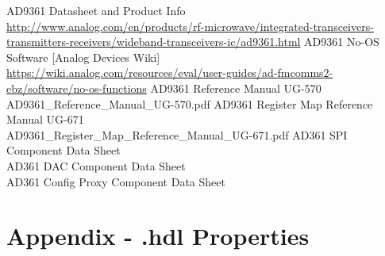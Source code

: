\begin{thebibliography}{1}

 AD9361 Datasheet and Product Info \\
\url{http://www.analog.com/en/products/rf-microwave/integrated-transceivers-transmitters-receivers/wideband-transceivers-ic/ad9361.html}
 AD9361 No-OS Software [Analog Devices Wiki]\\
\url{https://wiki.analog.com/resources/eval/user-guides/ad-fmcomms2-ebz/software/no-os-functions}
 AD9361 Reference Manual UG-570\\
AD9361\_Reference\_Manual\_UG-570.pdf
 AD9361 Register Map Reference Manual UG-671\\
AD9361\_Register\_Map\_Reference\_Manual\_UG-671.pdf
 AD361 SPI Component Data Sheet \\
 AD361 DAC Component Data Sheet \\
 AD361 Config Proxy Component Data Sheet \\

\end{thebibliography}
\pagebreak
\landscape
\section{Appendix - \comp{}.hdl Properties}
\label{appendix:properties}
\begin{scriptsize}

\end{scriptsize}
\pagebreak

